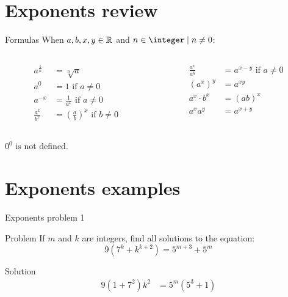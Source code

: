 \section{Exponents review}
\begin{namedframe}{Formulas}
	When $a, b, x, y \in \mathbb{R}$ and $n \in \integer \such n \neq 0$:
	\begin{columns}
		\begin{column}{0.5\textwidth}
			\begin{align*}
				a^{\frac{1}{n}} &= \sqrt[n]{a}\\
				a^0             &= 1 \text{ if } a \neq 0\\
				a^{-x}          &= \frac{1}{a^x} \text{ if } a \neq 0\\
				\frac{a^x}{b^x} &= \left( \frac{a}{b} \right)^x \text{ if } b \neq 0
			\end{align*}
		\end{column}
		\begin{column}{0.5\textwidth}
			\begin{align*}
				\frac{a^x}{a^y}       &= a^{x-y} \text{ if } a \neq 0\\
				\left( a^x \right)^ y &= a^{xy}\\
				a^x \cdot b^x         &= (ab)^x\\
				a^x a^y               &= a^{x + y}
			\end{align*}
		\end{column}
	\end{columns}
	$0^0$ is not defined.
\end{namedframe}
\section{Exponents examples}
\begin{namedframe}{Exponents problem 1}
	\begin{exampleblock}{Problem}
		If $m$ and $k$ are integers, find all solutions to the equation:
		\vspace{-1ex}
		\[9(7^k + k^{k+2}) = 5^{m+3} + 5^m\]
		\vspace{-4ex}
	\end{exampleblock}
	\pause
	\begin{block}{Solution}
		\vspace{-3ex}
		\begin{align*}
			9(1 + 7^2)k^2 &= 5^m(5^3 + 1)\\
		\end{align*}
	\end{block}
\end{namedframe}
